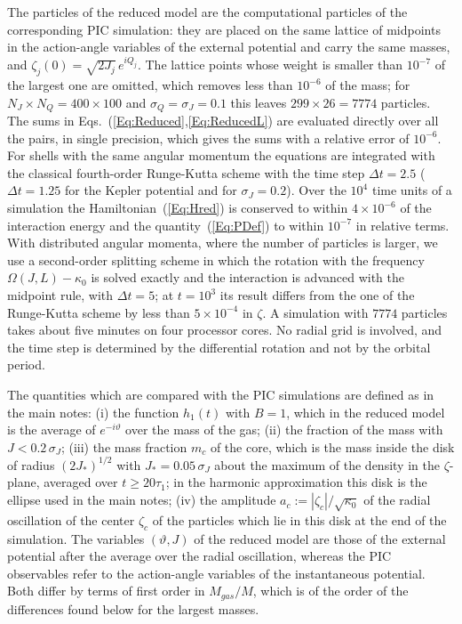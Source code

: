 \documentclass[prd,aps,nofootinbib,superscriptaddress,amsmath,amssymb]{revtex4}
\begin{document}
The particles of the reduced model are the computational particles of the corresponding PIC simulation: they are placed on the same lattice of midpoints in the action-angle variables of the external potential and carry the same masses, and $\zeta_j(0) = \sqrt{2J_j}\, e^{iQ_j}$. The lattice points whose weight is smaller than $10^{-7}$ of the largest one are omitted, which removes less than $10^{-6}$ of the mass; for $N_J\times N_Q = 400\times 100$ and $\sigma_Q = \sigma_J = 0.1$ this leaves $299\times 26 = 7774$ particles. The sums in Eqs.~(\ref{Eq:Reduced},\ref{Eq:ReducedL}) are evaluated directly over all the pairs, in single precision, which gives the sums with a relative error of $10^{-6}$. For shells with the same angular momentum the equations are integrated with the classical fourth-order Runge-Kutta scheme with the time step $\Delta t = 2.5$ ($\Delta t = 1.25$ for the Kepler potential and for $\sigma_J = 0.2$). Over the $10^4$ time units of a simulation the Hamiltonian~(\ref{Eq:Hred}) is conserved to within $4\times 10^{-6}$ of the interaction energy and the quantity~(\ref{Eq:PDef}) to within $10^{-7}$ in relative terms. With distributed angular momenta, where the number of particles is larger, we use a second-order splitting scheme in which the rotation with the frequency $\Omega(J,L) - \kappa_0$ is solved exactly and the interaction is advanced with the midpoint rule, with $\Delta t = 5$; at $t = 10^3$ its result differs from the one of the Runge-Kutta scheme by less than $5\times 10^{-4}$ in $\zeta$. A simulation with $7774$ particles takes about five minutes on four processor cores. No radial grid is involved, and the time step is determined by the differential rotation and not by the orbital period.

The quantities which are compared with the PIC simulations are defined as in the main notes: (i) the function $h_1(t)$ with $B = 1$, which in the reduced model is the average of $e^{-i\vartheta}$ over the mass of the gas; (ii) the fraction of the mass with $J < 0.2\,\sigma_J$; (iii) the mass fraction $m_c$ of the core, which is the mass inside the disk of radius $(2J_*)^{1/2}$ with $J_* = 0.05\,\sigma_J$ about the maximum of the density in the $\zeta$-plane, averaged over $t\geq 20\tau_1$; in the harmonic approximation this disk is the ellipse used in the main notes; (iv) the amplitude $a_c := |\zeta_c|/\sqrt{\kappa_0}$ of the radial oscillation of the center $\zeta_c$ of the particles which lie in this disk at the end of the simulation. The variables $(\vartheta,J)$ of the reduced model are those of the external potential after the average over the radial oscillation, whereas the PIC observables refer to the action-angle variables of the instantaneous potential. Both differ by terms of first order in $M_{gas}/M$, which is of the order of the differences found below for the largest masses.
\end{document}
